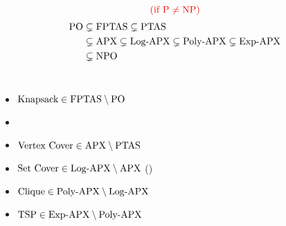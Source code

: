 \begin{frame}
  \[
	\textcolor{red}{(\text{if } \text{P}{} \neq \text{NP}{})}
  \]
  \begin{align*}
	\text{PO} &\subsetneq \text{FPTAS} \subsetneq \text{PTAS} \\
	&\subsetneq \text{APX} \subsetneq \text{Log-APX} \subsetneq \text{Poly-APX} \subsetneq \text{Exp-APX} \\
	&\subsetneq \text{NPO}
  \end{align*}

  \pause
  \begin{columns}
	  \begin{itemize}
		\setlength{\itemsep}{5pt}
		\item $\text{Knapsack} \in \text{FPTAS} \setminus \text{PO}$
		\item {}
		\item $\text{Vertex Cover} \in \text{APX} \setminus \text{PTAS}$ 
		\item $\text{Set Cover} \in \text{Log-APX} \setminus \text{APX}$ ({\small {}})
		\item $\text{Clique} \in \text{Poly-APX} \setminus \text{Log-APX}$
		\item $\text{TSP} \in \text{Exp-APX} \setminus \text{Poly-APX}$
	  \end{itemize}
  \end{columns}
\end{frame}
